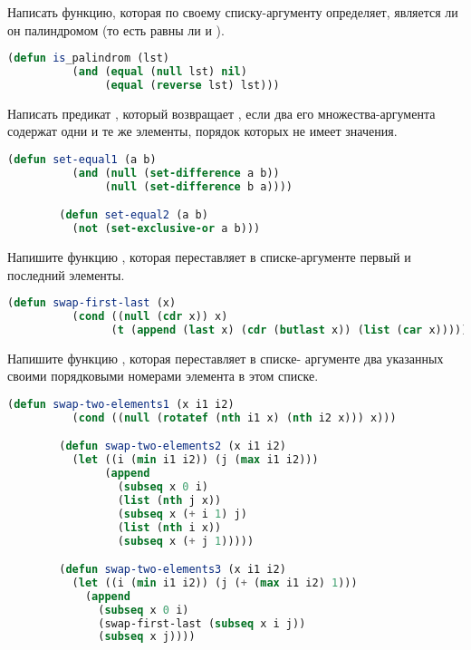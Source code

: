 \documentclass[a4paper,oneside,12pt]{extreport}
\begin{document}


\begin{task}
	Написать функцию, которая по своему списку-аргументу  определяет, является ли он палиндромом (то есть равны ли  и ).

	\begin{lstlisting}[language=Lisp, gobble=16]
		(defun is_palindrom (lst)
		  (and (equal (null lst) nil)
		       (equal (reverse lst) lst)))
	\end{lstlisting}
\end{task}

\begin{task}
	Написать предикат , который возвращает , если два его множества-аргумента содержат одни и те же элементы, порядок которых не имеет значения.
	\begin{lstlisting}[language=Lisp, gobble=16]
		(defun set-equal1 (a b)
		  (and (null (set-difference a b))
		       (null (set-difference b a))))

		(defun set-equal2 (a b)
		  (not (set-exclusive-or a b)))
	\end{lstlisting}
\end{task}

\begin{task}
	Напишите функцию , которая переставляет в списке-аргументе первый и последний элементы.

	\begin{lstlisting}[language=Lisp, gobble=16]
		(defun swap-first-last (x)
		  (cond ((null (cdr x)) x)
		        (t (append (last x) (cdr (butlast x)) (list (car x))))))
	\end{lstlisting}
\end{task}

\begin{task}
	Напишите функцию , которая переставляет в списке- аргументе два указанных своими порядковыми номерами элемента в этом списке.

	\begin{lstlisting}[language=Lisp, gobble=16]
		(defun swap-two-elements1 (x i1 i2)
		  (cond ((null (rotatef (nth i1 x) (nth i2 x))) x)))

		(defun swap-two-elements2 (x i1 i2)
		  (let ((i (min i1 i2)) (j (max i1 i2)))
		       (append
		         (subseq x 0 i)
		         (list (nth j x))
		         (subseq x (+ i 1) j)
		         (list (nth i x))
		         (subseq x (+ j 1)))))

		(defun swap-two-elements3 (x i1 i2)
		  (let ((i (min i1 i2)) (j (+ (max i1 i2) 1)))
		    (append
		      (subseq x 0 i)
		      (swap-first-last (subseq x i j))
		      (subseq x j))))
	\end{lstlisting}
\end{task}
\end{document}
